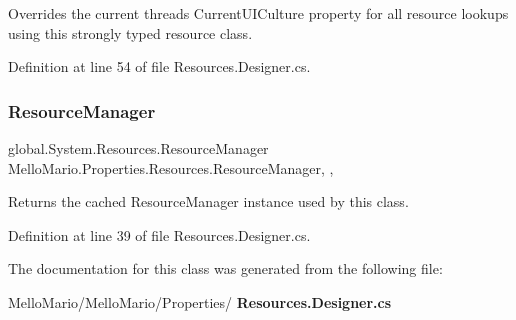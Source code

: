 Overrides the current thread\textquotesingle{}s Current\+U\+I\+Culture property for all resource lookups using this strongly typed resource class. 



Definition at line 54 of file Resources.\+Designer.\+cs.

\mbox{\label{classMelloMario_1_1Properties_1_1Resources_af0b3262d1d0ee8146c914afd91972ff8}} 
\subsubsection{Resource\+Manager}
{\footnotesize\ttfamily global.\+System.\+Resources.\+Resource\+Manager Mello\+Mario.\+Properties.\+Resources.\+Resource\+Manager\hspace{0.3cm}{\ttfamily [static]}, {\ttfamily [get]}, {\ttfamily [package]}}



Returns the cached Resource\+Manager instance used by this class. 



Definition at line 39 of file Resources.\+Designer.\+cs.



The documentation for this class was generated from the following file\+:\begin{DoxyCompactItemize}
\item 
Mello\+Mario/\+Mello\+Mario/\+Properties/\textbf{ Resources.\+Designer.\+cs}\end{DoxyCompactItemize}
